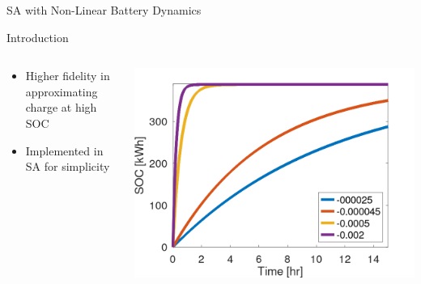\documentclass[aspectratio=169,dvipsnames]{beamer}
\begin{document}
\begin{frame}[label={sec:org48e9d88}]{}
\centering
\Huge SA with Non-Linear Battery Dynamics
\end{frame}

\begin{frame}[label={sec:orgaf8e68c}]{Introduction}
\begin{columns}
\begin{column}{0.3\columnwidth}
\begin{itemize}
\item Higher fidelity in approximating charge at high SOC
\item Implemented in SA for simplicity
\end{itemize}
\end{column}

\begin{column}{0.7\columnwidth}
\begin{center}
\includegraphics[width=.9\linewidth]{./img/nonlinear-bat.png}
\end{center}
\end{column}
\end{columns}
\end{frame}
\end{document}
